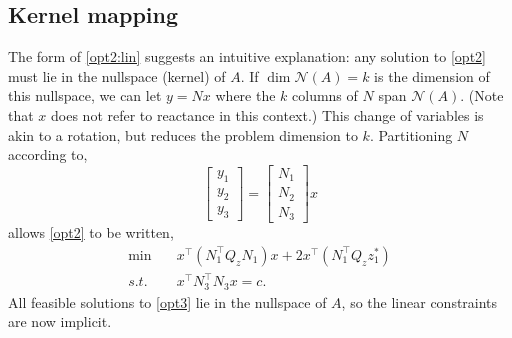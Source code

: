 \documentclass[journal,twoside]{IEEEtran}
\begin{document}
\subsection{Kernel mapping}\label{sec:solution-kernel}
The form of \eqref{opt2:lin} suggests an intuitive explanation: any
solution to \eqref{opt2} must lie in the nullspace (kernel) of $A$. If
$\dim \mathcal{N}(A) =k$ is the dimension of this nullspace, we can
let $y=Nx$ where the $k$ columns of $N$ span $\mathcal{N}(A)$. (Note
that $x$ does not refer to reactance in this context.) This change of
variables is akin to a rotation, but reduces the problem dimension to
$k$. Partitioning $N$ according to,
\[
\begin{bmatrix} y_1 \\ y_2 \\ y_3 \end{bmatrix} = \begin{bmatrix} N_1
  \\ N_2 \\ N_3 \end{bmatrix} x
\]
allows \eqref{opt2} to be written,
\begin{subequations}\label{opt3}
\begin{align}
\label{opt3:obj} \min\quad  &x^\top (N_1^\top Q_zN_1) x + 2x^\top
(N_1^\top Q_zz_1^*) \\
\label{opt3:quad} s.t.\quad &x^\top N_3^\top N_3 x = c.
\end{align}
\end{subequations}
All feasible solutions to \eqref{opt3} lie in the nullspace of $A$, so
the linear constraints are now implicit.
\end{document}
